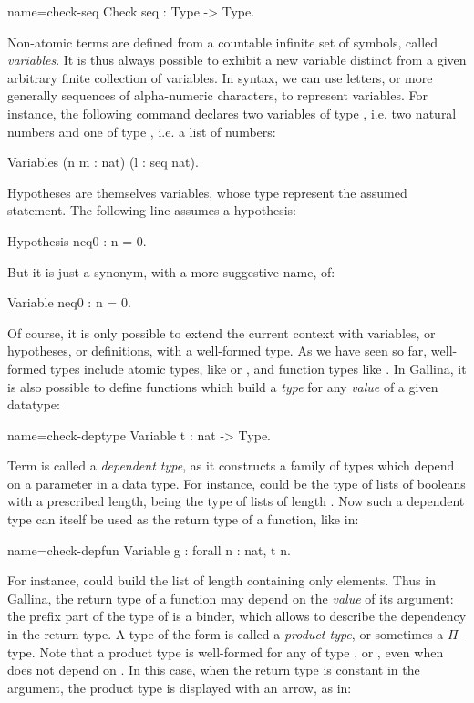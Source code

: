 \begin{coq}{name=check-seq}{}
Check seq : Type -> Type.
\end{coq}

Non-atomic terms are defined from a countable infinite set of
symbols, called  \emph{variables}.
It is thus always possible to exhibit a new variable
distinct from a given arbitrary finite collection of variables. In \Coq{}
syntax, we can use letters, or more generally sequences of
alpha-numeric characters, to represent variables. For instance, the
following command declares two variables of type , i.e. two
natural numbers and one of type , i.e. a list of numbers:

\begin{coq}{}{}
Variables (n m : nat) (l : seq nat).
\end{coq}

Hypotheses are themselves variables, whose type represent the
assumed statement. The following line assumes a hypothesis:

\begin{coq}{}{}
Hypothesis neq0 : n = 0.
\end{coq}
But it is just a synonym, with a more suggestive name, of:
\begin{coq}{}{}
Variable neq0 : n = 0.
\end{coq}

Of course, it is only possible to extend the current context with variables, or
hypotheses, or definitions, with a well-formed type. As we have seen
so far, well-formed types include atomic types, like  or
, and function types like . In Gallina, it is
also possible to define functions which build a \emph{type} for any
\emph{value} of a given datatype:
\begin{coq}{name=check-deptype}{}
Variable t : nat -> Type.
\end{coq}

Term  is called a \emph{dependent type}, as it constructs a
family of types which depend on a parameter in a data type. For
instance,  could be the type of lists of booleans with a
prescribed length,  being the type of lists of length
. Now such a dependent type can itself be used as the return type
of a function, like in: 

\begin{coq}{name=check-depfun}{}
Variable g : forall n : nat, t n.
\end{coq}

For instance,  could build the list of length  containing
only  elements.
Thus in Gallina, the return type of a function may depend on the
\emph{value} of its argument: the prefix  part of the
type of  is a binder, which allows to describe the dependency in
the return type. A type of the form  is called a
\emph{product type}, or sometimes a $\Pi$-type. Note that a product
type  is well-formed for any  of type ,
 or , even when  does not depend on . In this
case, when the return type is constant in the argument, the product
type is displayed with an arrow, as in:


